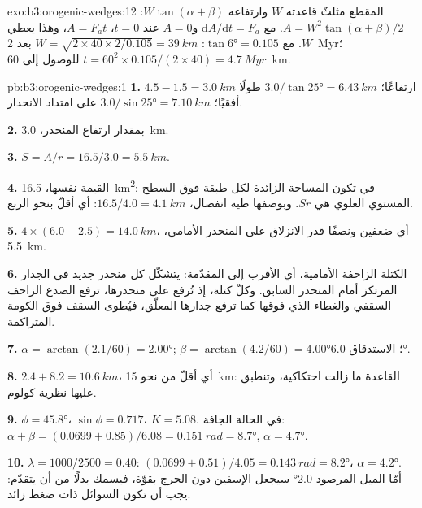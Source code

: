 \begin{solution}{exo:b3:orogenic-wedges:12}
المقطع مثلثٌ قاعدته $W$ وارتفاعه $W\tan(\alpha + \beta)$:
$A = W^2\tan(\alpha + \beta)/2$. مع $\mathrm dA/\mathrm dt = F_a$ و$A =
0$ عند $t = 0$، $A = F_at$، وهذا يعطي $W$. مع $\tan\ang{6} = 0.105$:
$W = \sqrt{2\times40\times2/0.105} = \qty{39}{km}$ بعد \qty{2}{Myr}؛ $t =
60^2\times0.105/(2\times40) = \qty{4.7}{Myr}$ للوصول إلى \qty{60}{km}.
\end{solution}

\begin{solution}{pb:b3:orogenic-wedges:1}
\textbf{1.} $4.5 - 1.5 = \qty{3.0}{km}$ ارتفاعًا؛ $3.0/\tan\ang{25} =
\qty{6.43}{km}$ طولًا أفقيًا؛ $3.0/\sin\ang{25} = \qty{7.10}{km}$ على امتداد
الانحدار.

\textbf{2.} بمقدار ارتفاع المنحدر، \qty{3.0}{km}.

\textbf{3.} $S = A/r = 16.5/3.0 = \qty{5.5}{km}$.

\textbf{4.} القيمة نفسها، \qty{16.5}{km^2}: في  تكون المساحة الزائدة
لكل طبقة فوق السطح المستوي العلوي هي $Sr$. وبوصفها طية انفصال، $16.5/4.0 =
\qty{4.1}{km}$: أي أقلّ بنحو الربع.

\textbf{5.} $4\times(6.0 - 2.5) = \qty{14.0}{km}$، أي ضعفين ونصفًا قدر
الانزلاق على المنحدر الأمامي، \qty{5.5}{km}.

\textbf{6.} الكتلة الزاحفة الأمامية، أي الأقرب إلى المقدّمة: يتشكّل كل منحدر جديد
في الجدار المرتكز أمام المنحدر السابق. وكلّ كتلة، إذ تُرفع على منحدرها،
ترفع الصدع الزاحف السقفي والغطاء الذي فوقها كما ترفع  جدارها
المعلّق، فيُطوى السقف فوق الكومة المتراكمة.

\textbf{7.} $\alpha = \arctan(2.1/60) = \ang{2.00}$; $\beta =
\arctan(4.2/60) = \ang{4.00}$؛ الاستدقاق \ang{6.0}.

\textbf{8.} $2.4 + 8.2 = \qty{10.6}{km}$، أي أقلّ من نحو \qty{15}{km}: القاعدة
ما زالت احتكاكية، وتنطبق عليها نظرية كولوم.

\textbf{9.} $\phi = \ang{45.8}$، $\sin\phi = 0.717$، $K = 5.08$. في الحالة الجافة:
$\alpha + \beta = (0.0699 + 0.85)/6.08 = \qty{0.151}{rad} = \ang{8.7}$,
$\alpha = \ang{4.7}$.

\textbf{10.} $\lambda = 1000/2500 = 0.40$: $(0.0699 + 0.51)/4.05 =
\qty{0.143}{rad} = \ang{8.2}$، $\alpha = \ang{4.2}$. أمّا الميل المرصود \ang{2.0}
سيجعل الإسفين دون الحرج بقوّة، فيسمك بدلًا من أن يتقدّم:
يجب أن تكون السوائل ذات ضغط زائد.


\end{solution}

